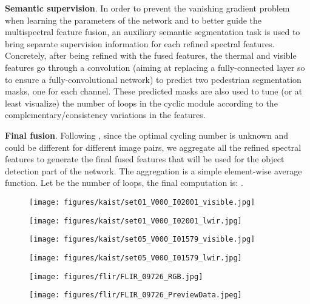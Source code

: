 \documentclass{article}
\begin{document}
\noindent
\textbf{Semantic supervision}. In order to prevent the vanishing gradient problem when learning the parameters of the network and to better guide the multispectral feature fusion, an auxiliary semantic segmentation task is used to bring separate supervision information for each refined spectral features. Concretely, after being refined with the fused features, the thermal and visible features go through a  convolution (aiming at replacing a fully-connected layer so to ensure a fully-convolutional network) to predict two pedestrian segmentation masks, one for each channel.
These predicted masks are also used to tune (or at least visualize) the number of loops in the cyclic module according to the complementary/consistency variations in the features.

\noindent
\textbf{Final fusion}. Following \cite{Deraining}, since the optimal cycling number is unknown and could be different for different image pairs, we aggregate all the refined spectral features to generate the final fused features that will be used for the object detection part of the network. The aggregation is a simple element-wise average function. Let  be the number of loops, the final computation is: . \begin{figure}[]
\centering
\begin{minipage}[b]{.241\linewidth}
  \centering
  \centerline{\texttt{[image: figures/kaist/set01\_V000\_I02001\_visible.jpg]}}
\end{minipage}
\begin{minipage}[b]{.241\linewidth}
  \centering
  \centerline{\texttt{[image: figures/kaist/set01\_V000\_I02001\_lwir.jpg]}}
\end{minipage}
\begin{minipage}[b]{.241\linewidth}
  \centering
  \centerline{\texttt{[image: figures/kaist/set05\_V000\_I01579\_visible.jpg]}}
\end{minipage}
\begin{minipage}[b]{.241\linewidth}
  \centering
  \centerline{\texttt{[image: figures/kaist/set05\_V000\_I01579\_lwir.jpg]}}
\end{minipage}
\begin{minipage}[b]{.241\linewidth}
  \centering
  \centerline{\texttt{[image: figures/flir/FLIR\_09726\_RGB.jpg]}}
\end{minipage}
\begin{minipage}[b]{.241\linewidth}
  \centering
  \centerline{\texttt{[image: figures/flir/FLIR\_09726\_PreviewData.jpeg]}}

\end{minipage}
\end{figure}
\end{document}

